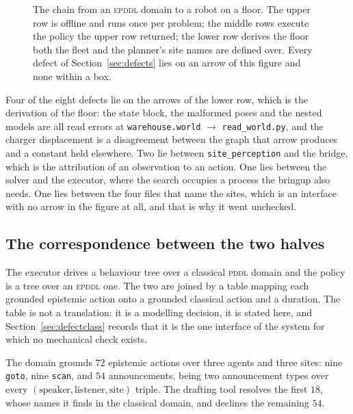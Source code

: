 \documentclass[11pt,a4paper]{article}
\theoremstyle{definition}
\newcommand{\code}[1]{\texttt{\small #1}}
\begin{document}
\begin{figure}[H]
\caption{The chain from an \textsc{epddl} domain to a robot on a floor. The
upper row is offline and runs once per problem; the middle rows execute the
policy the upper row returned; the lower row derives the floor both the fleet
and the planner's site names are defined over. Every defect of
Section~\ref{sec:defects} lies on an arrow of this figure and none within a
box.}
\label{fig:chain}
\end{figure}

Four of the eight defects lie on the arrows of the lower row, which is the
derivation of the floor: the state block, the malformed poses and the nested
models are all read errors at
\code{warehouse.world} $\to$ \code{read\_world.py}, and the charger
displacement is a disagreement between the graph that arrow produces and a
constant held elsewhere. Two lie between \code{site\_perception} and the
bridge, which is the attribution of an observation to an action. One lies
between the solver and the executor, where the search occupies a process the
bringup also needs. One lies between the four files that name the sites, which
is an interface with no arrow in the figure at all, and that is why it went
unchecked.

\subsection{The correspondence between the two halves}
\label{sec:mapping}

The executor drives a behaviour tree over a classical \textsc{pddl} domain and
the policy is a tree over an \textsc{epddl} one. The two are joined by a table
mapping each grounded epistemic action onto a grounded classical action and a
duration. The table is not a translation: it is a modelling decision, it is
stated here, and Section~\ref{sec:defectclass} records that it is the one
interface of the system for which no mechanical check exists.

The domain grounds $72$ epistemic actions over three agents and three sites:
nine \code{goto}, nine \code{scan}, and $54$ announcements, being two
announcement types over every $(\text{speaker}, \text{listener}, \text{site})$
triple. The drafting tool resolves the first $18$, whose names it finds in the
classical domain, and declines the remaining $54$.
\end{document}

